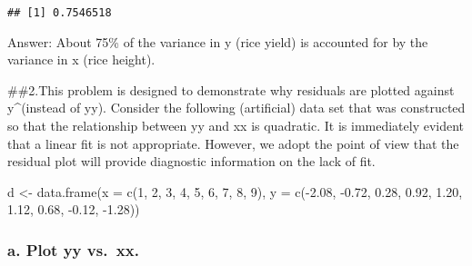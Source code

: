 \documentclass[
]{article}
\newenvironment{Shaded}{\begin{snugshade}}{\end{snugshade}}
\newcommand{\AttributeTok}[1]{\textcolor[rgb]{0.77,0.63,0.00}{#1}}
\newcommand{\DecValTok}[1]{\textcolor[rgb]{0.00,0.00,0.81}{#1}}
\newcommand{\FloatTok}[1]{\textcolor[rgb]{0.00,0.00,0.81}{#1}}
\newcommand{\FunctionTok}[1]{\textcolor[rgb]{0.00,0.00,0.00}{#1}}
\newcommand{\NormalTok}[1]{#1}
\newcommand{\OtherTok}[1]{\textcolor[rgb]{0.56,0.35,0.01}{#1}}
\newcommand{\SpecialCharTok}[1]{\textcolor[rgb]{0.00,0.00,0.00}{#1}}
\begin{document}
\begin{Shaded}
\end{Shaded}

\begin{verbatim}
## [1] 0.7546518
\end{verbatim}

Answer: About 75\% of the variance in y (rice yield) is accounted for by
the variance in x (rice height).

\#\#2.This problem is designed to demonstrate why residuals are plotted
against y\^{}(instead of yy). Consider the following (artificial)
data set that was constructed so that the relationship between yy and xx
is quadratic. It is immediately evident that a linear fit is not
appropriate. However, we adopt the point of view that the residual plot
will provide diagnostic information on the lack of fit.

\begin{Shaded}
\begin{Highlighting}[]
\NormalTok{d }\OtherTok{\textless{}{-}} \FunctionTok{data.frame}\NormalTok{(}\AttributeTok{x =} \FunctionTok{c}\NormalTok{(}\DecValTok{1}\NormalTok{, }\DecValTok{2}\NormalTok{, }\DecValTok{3}\NormalTok{, }\DecValTok{4}\NormalTok{, }\DecValTok{5}\NormalTok{, }\DecValTok{6}\NormalTok{, }\DecValTok{7}\NormalTok{, }\DecValTok{8}\NormalTok{, }\DecValTok{9}\NormalTok{),}
\AttributeTok{y =} \FunctionTok{c}\NormalTok{(}\SpecialCharTok{{-}}\FloatTok{2.08}\NormalTok{, }\SpecialCharTok{{-}}\FloatTok{0.72}\NormalTok{, }\FloatTok{0.28}\NormalTok{, }\FloatTok{0.92}\NormalTok{, }\FloatTok{1.20}\NormalTok{, }\FloatTok{1.12}\NormalTok{, }\FloatTok{0.68}\NormalTok{, }\SpecialCharTok{{-}}\FloatTok{0.12}\NormalTok{, }\SpecialCharTok{{-}}\FloatTok{1.28}\NormalTok{))}
\end{Highlighting}
\end{Shaded}

\hypertarget{a.-plot-yy-vs.-xx.}{%
\subsubsection{a. Plot yy vs.~xx.}\label{a.-plot-yy-vs.-xx.}}

\begin{Shaded}
\end{Shaded}
\end{document}

